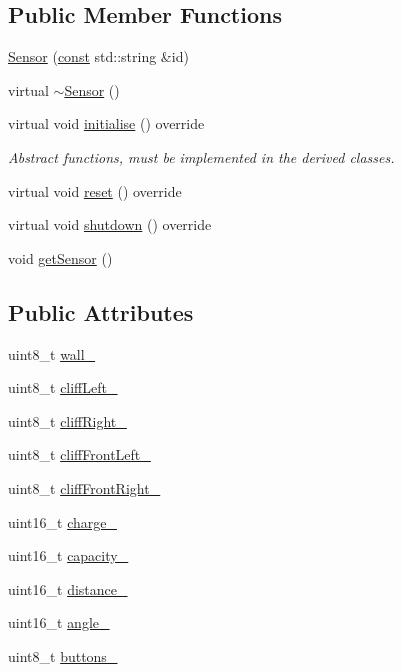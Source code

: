 \subsection*{Public Member Functions}
\begin{DoxyCompactItemize}
\item 
\hyperlink{class_sensor_a8615bafe3f2aa8f8b12b1199eaa577c4}{Sensor} (\hyperlink{functions__c_8js_afacfd9c985d225bb07483b887a801b6f}{const} std\+::string \&id)
\item 
virtual \hyperlink{class_sensor_aa730e9961dd645e9df9644c52b6e72eb}{$\sim$\+Sensor} ()
\item 
virtual void \hyperlink{class_sensor_aa6175cacabc044409786f6d43a72ae29}{initialise} () override
\begin{DoxyCompactList}\small\item\em Abstract functions, must be implemented in the derived classes. \end{DoxyCompactList}\item 
virtual void \hyperlink{class_sensor_a004fc50012f81dbfdce7a2541fa6130d}{reset} () override
\item 
virtual void \hyperlink{class_sensor_a9b3ea7f61f41b68a4fb9141d887a7271}{shutdown} () override
\item 
void \hyperlink{class_sensor_a6ee10780572766a9488cb34f8d4d0550}{get\+Sensor} ()
\end{DoxyCompactItemize}
\subsection*{Public Attributes}
\begin{DoxyCompactItemize}
\item 
uint8\+\_\+t \hyperlink{class_sensor_a09506b22991de665b8e85727bfced262}{wall\+\_\+}
\item 
uint8\+\_\+t \hyperlink{class_sensor_a89a6486654f1185fd60f328688862d8c}{cliff\+Left\+\_\+}
\item 
uint8\+\_\+t \hyperlink{class_sensor_a8d9d5b9904b3f5efcf9b0bcfc7b9a935}{cliff\+Right\+\_\+}
\item 
uint8\+\_\+t \hyperlink{class_sensor_ab1a85642aa3468803b02d8ebfa6e1c4d}{cliff\+Front\+Left\+\_\+}
\item 
uint8\+\_\+t \hyperlink{class_sensor_a5bff8fe2bb2ee243c3c62646d8111d46}{cliff\+Front\+Right\+\_\+}
\item 
uint16\+\_\+t \hyperlink{class_sensor_a2ab14861ceb9304f9b6dc7a8eab5e156}{charge\+\_\+}
\item 
uint16\+\_\+t \hyperlink{class_sensor_a7facd4c626717aa8dceebcd763df339f}{capacity\+\_\+}
\item 
uint16\+\_\+t \hyperlink{class_sensor_aca4dd39ba9201b4e6d4b8033310bb4d0}{distance\+\_\+}
\item 
uint16\+\_\+t \hyperlink{class_sensor_ab6b2271ec67379c1adb9cc8d81f38db9}{angle\+\_\+}
\item 
uint8\+\_\+t \hyperlink{class_sensor_a4f50f4893bd2600973bb20b2f56fd184}{buttons\+\_\+}
\end{DoxyCompactItemize}
